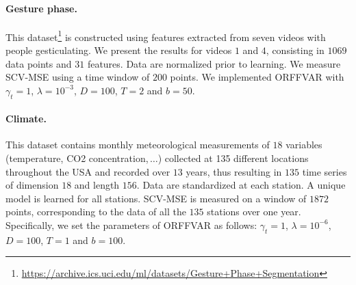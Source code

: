 \paragraph{Gesture phase.}
This dataset\footnote{%
\url{https://archive.ics.uci.edu/ml/datasets/Gesture+Phase+Segmentation}} is
constructed using features extracted from seven videos with people
gesticulating. We present the results for videos $1$ and $4$, consisting in
$1069$ data points and $31$ features. Data are normalized prior to learning. We
measure \acs{SCV-MSE} using a time window of $200$ points. We implemented
\acs{ORFFVAR} with $\gamma_t = 1$, $\lambda = 10^{-3}$, $D=100$, $T=2$ and
$b=50$.
\paragraph{Climate.}
This dataset \citep{liu2010learning} contains monthly meteorological
measurements of $18$ variables (temperature, CO2 concentration,\,$\dots$)
collected at 135 different locations throughout the USA and recorded over $13$
years, thus resulting in $135$ time series of dimension $18$ and length $156$.
Data are standardized at each station. A unique model is learned for all
stations.  \acs{SCV-MSE} is measured on a window of $1872$ points,
corresponding to the data of all the $135$ stations over one year.
Specifically, we set the parameters of \acs{ORFFVAR} as follows: $\gamma_t =
1$, $\lambda = 10^{-6}$, $D=100$, $T=1$ and $b=100$.
